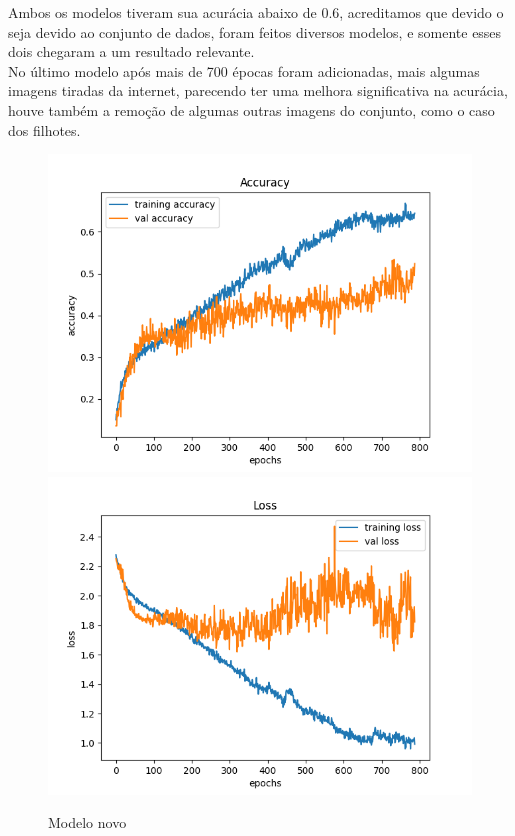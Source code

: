 \documentclass{article}
\begin{document}
Ambos os modelos tiveram sua acurácia abaixo de 0.6, acreditamos que devido o seja devido ao conjunto de dados, foram feitos diversos modelos, e somente esses dois chegaram a um resultado relevante.
\\
No último modelo após mais de 700 épocas foram adicionadas, mais algumas imagens tiradas da internet, parecendo ter uma melhora significativa na acurácia, houve também a remoção de algumas outras imagens do conjunto, como o caso dos filhotes.

\begin{figure}[h]
    \centering
    \includegraphics[scale=0.45]{longo_epochs_accuracy}
    \includegraphics[scale=0.45]{longo_epochs_loss}
    \caption{Modelo novo}
\end{figure}
\end{document}
